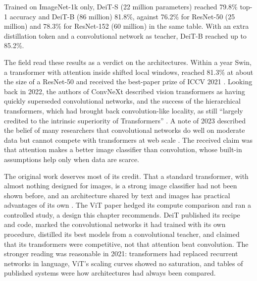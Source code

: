 \begin{refsection}
\begin{finding}\label{fd:confounding:deit}
Trained on ImageNet-1k only, DeiT-S (22 million parameters) reached 79.8\% top-1 accuracy and DeiT-B (86 million) 81.8\%, against 76.2\% for ResNet-50 (25 million) and 78.3\% for ResNet-152 (60 million) in the same table. With an extra distillation token and a convolutional network as teacher, DeiT-B reached up to 85.2\%.
\end{finding}

The field read these results as a verdict on the architectures. Within a year Swin, a transformer with attention inside shifted local windows, reached 81.3\% at about the size of a ResNet-50 and received the best-paper prize of ICCV 2021 \parencite{LiuEtAl2021}. Looking back in 2022, the authors of ConvNeXt described vision transformers as having quickly superseded convolutional networks, and the success of the hierarchical transformers, which had brought back convolution-like locality, as still \enquote{largely credited to the intrinsic superiority of Transformers} \parencite{LiuEtAl2022}. A note of 2023 described the belief of many researchers that convolutional networks do well on moderate data but cannot compete with transformers at web scale \parencite{SmithEtAl2023}. The received claim was that attention makes a better image classifier than convolution, whose built-in assumptions help only when data are scarce.

The original work deserves most of its credit. That a standard transformer, with almost nothing designed for images, is a strong image classifier had not been shown before, and an architecture shared by text and images has practical advantages of its own \parencite{SmithEtAl2023}. The ViT paper hedged its compute comparison and ran a controlled study, a design this chapter recommends. DeiT published its recipe and code, marked the convolutional networks it had trained with its own procedure, distilled its best models from a convolutional teacher, and claimed that its transformers were competitive, not that attention beat convolution. The stronger reading was reasonable in 2021: transformers had replaced recurrent networks in language, ViT's scaling curves showed no saturation, and tables of published systems were how architectures had always been compared.


\end{refsection}
